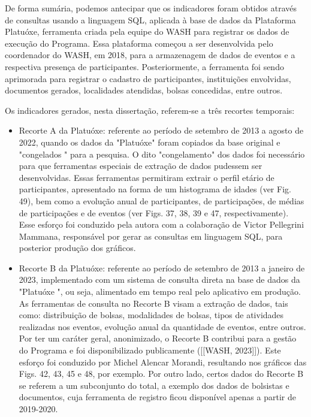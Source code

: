De forma sumária, podemos antecipar que os indicadores foram obtidos através de consultas usando a linguagem SQL, aplicada à base de dados da Plataforma Platuóxe, ferramenta criada pela equipe do WASH para registrar os dados de execução do Programa. Essa plataforma começou a ser desenvolvida pelo coordenador do WASH, em 2018, para a armazenagem de dados de eventos e a respectiva presença de participantes. Posteriormente, a ferramenta foi sendo aprimorada para registrar o cadastro de participantes, instituições envolvidas, documentos gerados, localidades atendidas, bolsas concedidas, entre outros.

Os indicadores gerados, nesta dissertação, referem-se a três recortes temporais:


\begin{itemize}
\item Recorte A da Platuóxe: referente ao período de setembro de 2013 a agosto de 2022, quando os dados da "Platuóxe" foram copiados da base original e "congelados " para a pesquisa. O dito  "congelamento" dos dados foi necessário para que ferramentas especiais de extração de dados pudessem ser desenvolvidas. Essas ferramentas permitiram extrair o perfil etário de participantes, apresentado na forma de um histograma de idades (ver Fig. 49), bem como a evolução anual de participantes, de participações, de médias de participações e de eventos (ver Figs. 37, 38, 39 e 47, respectivamente). Esse esforço foi conduzido pela autora com a colaboração de Victor Pellegrini Mammana, responsável por gerar as consultas em linguagem SQL, para posterior produção dos gráficos.
\item Recorte B da Platuóxe: referente ao período de setembro de 2013 a janeiro de 2023, implementado com um sistema de consulta direta na base de dados da "Platuóxe ", ou seja, alimentado em tempo real pelo aplicativo em produção. As ferramentas de consulta no Recorte B visam a extração de dados, tais como: distribuição de bolsas, modalidades de bolsas, tipos de atividades realizadas nos eventos, evolução anual da quantidade de eventos,  entre outros. Por ter um caráter geral, anonimizado, o Recorte B contribui para a gestão do Programa e foi disponibilizado publicamente  ([[WASH, 2023]]). Este esforço foi conduzido por Michel Alencar Morandi, resultando nos gráficos das  Figs. 42, 43, 45 e 48, por exemplo. Por outro lado, certos dados do Recorte B se referem a um subconjunto do total, a exemplo dos dados de bolsistas e documentos, cuja ferramenta de registro ficou disponível apenas a partir de 2019-2020.

\end{itemize}
